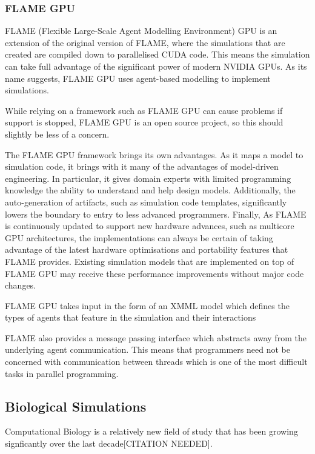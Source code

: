 \documentclass{UoYCSproject}
\begin{document}
\subsubsection{FLAME GPU}
FLAME (Flexible Large-Scale Agent Modelling Environment) GPU is an extension of the original version of FLAME, where the simulations that are created are compiled down to parallelised CUDA code. This means the simulation can take full advantage of the significant power of modern NVIDIA GPUs.
As its name suggests, FLAME GPU uses agent-based modelling to implement simulations.

While relying on a framework such as FLAME GPU can cause problems if support is stopped, FLAME GPU is an open source project, so this should slightly be less of a concern.

The FLAME GPU framework brings its own advantages.
As it maps a model to simulation code, it brings with it many of the advantages of model-driven engineering.
In particular, it gives domain experts with limited programming knowledge the ability to understand and help design models.
Additionally, the auto-generation of artifacts, such as simulation code templates, significantly lowers the boundary to entry to less advanced programmers.
Finally, As FLAME is continuously updated to support new hardware advances, such as multicore GPU architectures\cite{flame_simulation}, the implementations can always be certain of taking advantage of the latest hardware optimisations and portability features that FLAME provides. Existing simulation models that are implemented on top of FLAME GPU may receive these performance improvements without major code changes.

FLAME GPU takes input in the form of an XMML model which defines the types of agents that feature in the simulation and their interactions%

FLAME also provides a message passing interface which abstracts away from the underlying agent communication.
This means that programmers need not be concerned with communication between threads which is one of the most difficult tasks in parallel programming.

\subsection{Biological Simulations}
Computational Biology is a relatively new field of study that has been growing signficantly over the last decade[CITATION NEEDED].
\end{document}
